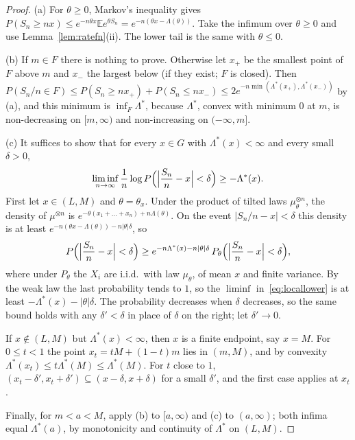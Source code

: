 \begin{proof}
(a) For $\theta\ge0$, Markov's inequality gives $P(S_n\ge nx)\le e^{-n\theta x}\mathbb Ee^{\theta S_n}=e^{-n(\theta x-\Lambda(\theta))}$. Take the infimum over $\theta\ge0$ and use
Lemma~\ref{lem:ratefn}(ii). The lower tail is the same with $\theta\le0$.

(b) If $m\in F$ there is nothing to prove. Otherwise let $x_+$ be the smallest point of $F$ above $m$ and $x_-$ the largest below (if they exist; $F$ is closed). Then
$P(S_n/n\in F)\le P(S_n\ge nx_+)+P(S_n\le nx_-)\le2e^{-n\min(\Lambda^*(x_+),\Lambda^*(x_-))}$ by (a), and this minimum is $\inf_F\Lambda^*$, because $\Lambda^*$, convex with minimum
$0$ at $m$, is non-decreasing on $[m,\infty)$ and non-increasing on $(-\infty,m]$.

(c) It suffices to show that for every $x\in G$ with $\Lambda^*(x)<\infty$ and every small $\delta>0$,
\begin{equation}\label{eq:locallower}
\liminf_{n\to\infty}\frac1n\log P\Bigl(\Bigl|\frac{S_n}n-x\Bigr|<\delta\Bigr)\ge-\Lambda^*(x).
\end{equation}
First let $x\in(L,M)$ and $\theta=\theta_x$. Under the product of tilted laws $\mu_\theta^{\otimes n}$, the density of $\mu^{\otimes n}$ is $e^{-\theta(x_1+\dots+x_n)+n\Lambda(\theta)}$. On the event
$|S_n/n-x|<\delta$ this density is at least $e^{-n(\theta x-\Lambda(\theta))-n|\theta|\delta}$, so
\[
P\Bigl(\Bigl|\frac{S_n}n-x\Bigr|<\delta\Bigr)\ge e^{-n\Lambda^*(x)-n|\theta|\delta}\,P_\theta\Bigl(\Bigl|\frac{S_n}n-x\Bigr|<\delta\Bigr),
\]
where under $P_\theta$ the $X_i$ are i.i.d.\ with law $\mu_\theta$, of mean $x$ and finite variance. By the weak law the last probability tends to $1$, so the $\liminf$ in~\eqref{eq:locallower}
is at least $-\Lambda^*(x)-|\theta|\delta$. The probability decreases when $\delta$ decreases, so the same bound holds with any $\delta'<\delta$ in place of $\delta$ on the right; let
$\delta'\to0$.

If $x\notin(L,M)$ but $\Lambda^*(x)<\infty$, then $x$ is a finite endpoint, say $x=M$. For $0\le t<1$ the point $x_t=tM+(1-t)m$ lies in $(m,M)$, and by convexity
$\Lambda^*(x_t)\le t\Lambda^*(M)\le\Lambda^*(M)$. For $t$ close to $1$, $(x_t-\delta',x_t+\delta')\subseteq(x-\delta,x+\delta)$ for a small $\delta'$, and the first case applies at $x_t$.

Finally, for $m<a<M$, apply (b) to $[a,\infty)$ and (c) to $(a,\infty)$; both infima equal $\Lambda^*(a)$, by monotonicity and continuity of $\Lambda^*$ on $(L,M)$.
\end{proof}

